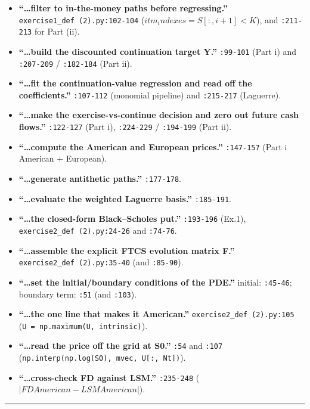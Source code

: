 \documentclass[
  11pt,
]{article}
\providecommand{\tightlist}{%
  \setlength{\itemsep}{0pt}\setlength{\parskip}{0pt}}
\begin{document}
\begin{itemize}
\tightlist
\item
  \textbf{``\ldots filter to in-the-money paths before regressing.''}
  \texttt{exercise1\_def\ (2).py:102-104}
  (\(itm_indexes = S[:,i+1] < K\)), and \texttt{:211-213} for Part (ii).
\item
  \textbf{``\ldots build the discounted continuation target Y.''}
  \texttt{:99-101} (Part i) and \texttt{:207-209} / \texttt{:182-184}
  (Part ii).
\item
  \textbf{``\ldots fit the continuation-value regression and read off
  the coefficients.''} \texttt{:107-112} (monomial pipeline) and
  \texttt{:215-217} (Laguerre).
\item
  \textbf{``\ldots make the exercise-vs-continue decision and zero out
  future cash flows.''} \texttt{:122-127} (Part i), \texttt{:224-229} /
  \texttt{:194-199} (Part ii).
\item
  \textbf{``\ldots compute the American and European prices.''}
  \texttt{:147-157} (Part i American + European).
\item
  \textbf{``\ldots generate antithetic paths.''} \texttt{:177-178}.
\item
  \textbf{``\ldots evaluate the weighted Laguerre basis.''}
  \texttt{:185-191}.
\item
  \textbf{``\ldots the closed-form Black--Scholes put.''}
  \texttt{:193-196} (Ex.1), \texttt{exercise2\_def\ (2).py:24-26} and
  \texttt{:74-76}.
\item
  \textbf{``\ldots assemble the explicit FTCS evolution matrix F.''}
  \texttt{exercise2\_def\ (2).py:35-40} (and \texttt{:85-90}).
\item
  \textbf{``\ldots set the initial/boundary conditions of the PDE.''}
  initial: \texttt{:45-46}; boundary term: \texttt{:51} (and
  \texttt{:103}).
\item
  \textbf{``\ldots the one line that makes it American.''}
  \texttt{exercise2\_def\ (2).py:105}
  (\texttt{U\ =\ np.maximum(U,\ intrinsic)}).
\item
  \textbf{``\ldots read the price off the grid at S0.''} \texttt{:54}
  and \texttt{:107}
  (\texttt{np.interp(np.log(S0),\ mvec,\ U{[}:,\ Nt{]})}).
\item
  \textbf{``\ldots cross-check FD against LSM.''} \texttt{:235-248}
  (\(|FD American - LSM American|\)).
\end{itemize}

\begin{center}\rule{0.5\linewidth}{0.5pt}\end{center}
\end{document}
